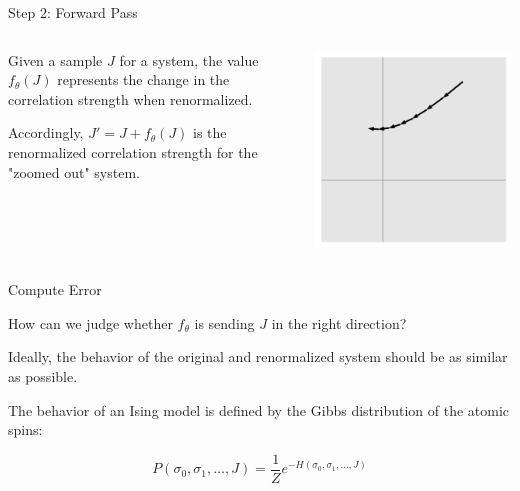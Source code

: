 \documentclass[aspectratio=169, 12pt]{beamer}
\begin{document}
\begin{frame}{Step 2: Forward Pass}

    \begin{columns}
        \begin{column}{.6\textwidth}
            
            Given a sample $J$ for a system, the value $f_\theta(J)$ represents the change in the correlation strength when renormalized. 

            \vspace{1em}
        
            Accordingly, $J' = J + f_\theta(J)$ is the renormalized correlation strength for the "zoomed out" system. 
            
        \end{column}
        \begin{column}{.4\textwidth}
            \includegraphics[width=\textwidth]{images/vector-steps.png}
        \end{column}
    \end{columns}

\end{frame}

\begin{frame}{Compute Error}

    How can we judge whether $f_\theta$ is sending $J$ in the right direction?

    \vspace{1em}

    Ideally, the behavior of the original and renormalized system should be as similar as possible. 

    \vspace{1em}

    The behavior of an Ising model is defined by the Gibbs distribution of the atomic spins:

    \[
    P(\sigma_0, \sigma_1, \dots, J) = \frac{1}{Z} e^{-H(\sigma_0, \sigma_1, \dots, J)}
    \]

\end{frame}
\end{document}
